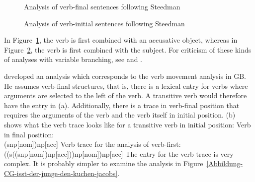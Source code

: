 \begin{figure}
\centerline{%
}
\caption{\label{Abbildung-CG-der-Mann-der-Frau-das-Buch-gibt}Analysis of verb-final sentences following Steedman}
\end{figure}%
\begin{figure}
\centerline{%
}
\caption{\label{Abbildung-CG-gibt-der-Mann-der-Frau-das-Buch}Analysis of verb-initial sentences following Steedman}
\end{figure}%
In Figure~\ref{Abbildung-CG-der-Mann-der-Frau-das-Buch-gibt}, the verb is first combined with an
accusative object, whereas in Figure~\ref{Abbildung-CG-gibt-der-Mann-der-Frau-das-Buch}, the verb is first combined with the subject. For criticism of these kinds of analyses
with variable branching, see  and .


\citet{Jacobs91a} developed an analysis which corresponds to the verb movement analysis in GB\indexgb. He assumes verb-final structures, that is, there is a lexical entry for verbs
where arguments are selected to the left of the verb. A transitive verb would therefore have the
entry in (a). Additionally, there is a trace in verb-final position that requires the
arguments of the verb and the verb itself in initial position. (b) shows what the verb trace
looks like for a transitive verb in initial position: 
\eal
\ex Verb in final position:\\
    (s\bs np[nom])\bs np[acc]
\ex Verb trace for the analysis of verb-first:\\
    ((s\bs ((s\bs np[nom])\bs np[acc]))\bs np[nom])\bs np[acc]
\zl
The entry for the verb trace is very complex. It is probably simpler to examine the analysis in Figure~\vref{Abbildung-CG-isst-der-junge-den-kuchen-jacobs}.

